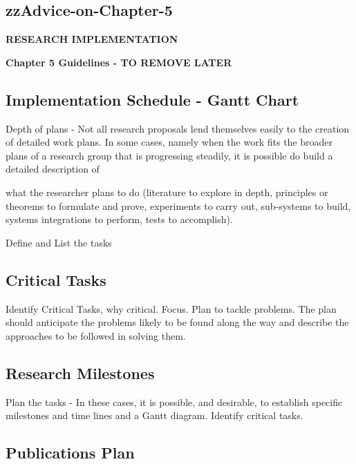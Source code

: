 \pagebreak
\begin{tcolorbox}
	
\section{zzAdvice-on-Chapter-5}

\textbf{RESEARCH IMPLEMENTATION}
\vspace*{1\baselineskip}

\textbf{Chapter 5 Guidelines - TO REMOVE LATER}	
\vspace*{1\baselineskip}	
	
\subsection{Implementation Schedule - Gantt Chart}

Depth of plans - Not all research proposals lend themselves easily to the creation of detailed work plans. In some cases, namely when the work fits the broader plans of a research group that is progressing steadily, it is possible do build a detailed description of 

what the researcher plans to do (literature to explore in depth, principles or theorems to formulate and prove, experiments to carry out, sub-systems to build, systems integrations to perform, tests to accomplish).

Define and List the tasks

\subsection{Critical Tasks} 

Identify Critical Tasks, why critical. Focus. Plan to tackle problems. The plan should anticipate the problems likely to be found along the way and describe the approaches to be followed in solving them.

\subsection{Research Milestones}

Plan the tasks - In these cases, it is possible, and desirable, to establish specific milestones and time lines and a Gantt diagram. Identify critical tasks.

\subsection{Publications Plan}


\end{tcolorbox}
